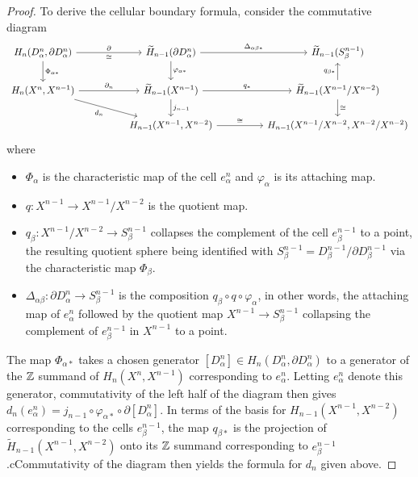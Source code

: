 \begin{proof}
To derive the cellular boundary formula, consider the commutative diagram
\[\begin{tikzcd}
H_n(D_\alpha^n,\partial D_\alpha^n)\ar[d,"\Phi_{\alpha*}"]\ar[rr,"\partial","\cong"']&&\widetilde{H}_{n-1}(\partial D^n_\alpha)\ar[d,"\varphi_{\alpha*}"]\ar[rr,"\Delta_{\alpha\beta*}"]&&\widetilde{H}_{n-1}(S^{n-1}_\beta)\\
H_n(X^n,X^{n-1})\ar[rrd,swap,"d_n"]\ar[rr,"\partial_n"]&&\widetilde{H}_{n-1}(X^{n-1})\ar[d,"j_{n-1}"]\ar[rr,"q_*"]&&\widetilde{H}_{n-1}(X^{n-1}/X^{n-2})\ar[u,"q_{\beta*}"]\ar[d,"\cong"]\\
&&H_{n-1}(X^{n-1},X^{n-2})\ar[rr,"\cong"]&&H_{n-1}(X^{n-1}/X^{n-2},X^{n-2}/X^{n-2})
\end{tikzcd}\]
where
\begin{itemize}
\item $\Phi_\alpha$ is the characteristic map of the cell $e^n_\alpha$ and $\varphi_\alpha$ is its attaching map.
\item $q:X^{n-1}\to X^{n-1}/X^{n-2}$ is the quotient map.
\item $q_\beta:X^{n-1}/X^{n-2}\to S^{n-1}_\beta$ collapses the complement of the cell $e^{n-1}_\beta$ to a point, the resulting quotient sphere being identified with $S^{n-1}_\beta=D^{n-1}_\beta/\partial D^{n-1}_\beta$ via the characteristic map $\Phi_\beta$.
\item $\Delta_{\alpha\beta}:\partial D^n_\alpha\to S^{n-1}_\beta$ is the composition $q_\beta\circ q\circ\varphi_\alpha$, in other words, the attaching map of $e^n_\alpha$ followed by the quotient map $X^{n-1}\to S^{n-1}_\beta$ collapsing the complement of $e^{n-1}_\beta$ in $X^{n-1}$ to a point.
\end{itemize}
The map $\Phi_{\alpha*}$ takes a chosen generator $[D^n_\alpha]\in H_n(D^n_\alpha,\partial D^n_\alpha)$ to a generator of the $\mathbb{Z}$ summand of $H_n(X^n,X^{n-1})$ corresponding to $e^n_\alpha$. Letting $e^n_\alpha$ denote this generator, commutativity of the left half of the diagram then gives $d_n(e^n_\alpha)=j_{n-1}\circ\varphi_{\alpha*}\circ \partial[D^n_\alpha]$. In
terms of the basis for $H_{n-1}(X^{n-1},X^{n-2})$ corresponding to the cells $e^{n-1}_\beta$, the map $q_{\beta*}$ is the projection of $\widetilde{H}_{n-1}(X^{n-1},X^{n-2})$ onto its $\mathbb{Z}$ summand corresponding to $e^{n-1}_\beta$.cCommutativity of the diagram then yields the formula for $d_n$ given above.
\end{proof}
